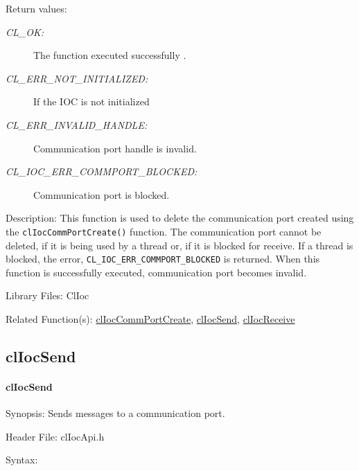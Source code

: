 \begin{flushleft}
\begin{Desc}
\item[Return values:]
\begin{description}
\item[{\em CL\_\-OK:}]The function executed successfully . 
\item[{\em CL\_\-ERR\_\-NOT\_\-INITIALIZED:}]If the IOC is not initialized 
\item[{\em CL\_\-ERR\_\-INVALID\_\-HANDLE:}] Communication port handle is invalid. 
\item[{\em CL\_\-IOC\_\-ERR\_\-COMMPORT\_\-BLOCKED:}]Communication port is blocked.
\end{description}
\end{Desc}


\begin{Desc}
\item[Description:]This function is used to delete the communication port created using the {\tt{clIocCommPortCreate()}} function.
The communication port cannot be deleted, if it is being used by a thread or, if it is blocked for receive. If a thread is blocked, the 
error, {\tt{CL\_\-IOC\_\-ERR\_\-COMMPORT\_\-BLOCKED}} is returned. When this function is successfully executed, communication port becomes invalid.
\end{Desc}
\begin{Desc}
\item[Library Files:]Cl\-Ioc\end{Desc}
\begin{Desc}
\item[Related Function(s):]\hyperlink{pageioc101}{cl\-Ioc\-Comm\-Port\-Create}, \hyperlink{pageioc104}{cl\-Ioc\-Send}, 
\hyperlink{pageioc105}{cl\-Ioc\-Receive} \end{Desc}
\newpage


\subsection{clIocSend}
\hypertarget{pageioc104}{}\paragraph{cl\-Ioc\-Send}\label{pageioc104}
\begin{Desc}
\item[Synopsis:]Sends messages to a communication port.\end{Desc}
\begin{Desc}
\item[Header File:]clIocApi.h\end{Desc}
\begin{Desc}
\item[Syntax:]


\end{Desc}
\end{flushleft}
